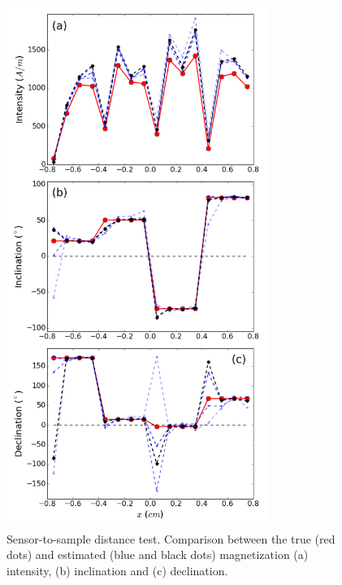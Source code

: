 \documentclass[draft,gc]{agutex}
\begin{document}
 \begin{figure}
 \noindent \includegraphics[width=20pc]{Figs/Fig10_LQ.png}
 \caption{Sensor-to-sample distance test. Comparison between the true (red dots)
 and estimated (blue and black dots) magnetization 
 (a) intensity, (b) inclination and (c) declination.
}
\end{figure}
\end{document}
